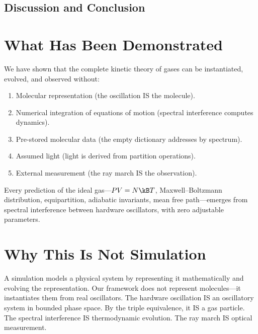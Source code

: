 
\subsection{Discussion and Conclusion}
\label{part:discussion}

\section{What Has Been Demonstrated}
\label{sec:demonstrated}

We have shown that the complete kinetic theory of gases can be instantiated, evolved, and observed without:
\begin{enumerate}
    \item Molecular representation (the oscillation IS the molecule).
    \item Numerical integration of equations of motion (spectral interference computes dynamics).
    \item Pre-stored molecular data (the empty dictionary addresses by spectrum).
    \item Assumed light (light is derived from partition operations).
    \item External measurement (the ray march IS the observation).
\end{enumerate}

Every prediction of the ideal gas---$PV = N\kB T$, Maxwell--Boltzmann distribution, equipartition, adiabatic invariants, mean free path---emerges from spectral interference between hardware oscillators, with zero adjustable parameters.

\section{Why This Is Not Simulation}
\label{sec:not_simulation}

A simulation models a physical system by representing it mathematically and evolving the representation. Our framework does not represent molecules---it instantiates them from real oscillators. The hardware oscillation IS an oscillatory system in bounded phase space. By the triple equivalence, it IS a gas particle. The spectral interference IS thermodynamic evolution. The ray march IS optical measurement.

